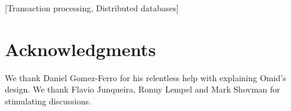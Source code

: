 \documentclass{acm_proc_article-sp}
\begin{document}
\date{30 July 1999}

\maketitle



[Transaction processing,
Distributed databases] 






%
% 



\section{Acknowledgments}
We thank Daniel Gomez-Ferro for his relentless help with 
explaining Omid's design. We thank Flavio Junqueira, 
Ronny Lempel and Mark Shovman for stimulating discussions.
%

%
%
\balancecolumns
\end{document}
